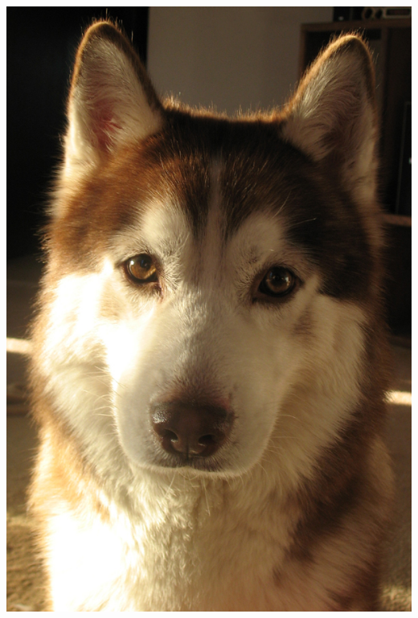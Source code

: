 \documentclass[12pt,utf8]{beamer}
\begin{document}
	\begin{frame}
		\centering
		\includegraphics[scale=0.2]{resources/doggo.jpg}\qquad\qquad

\end{frame}
\end{document}
